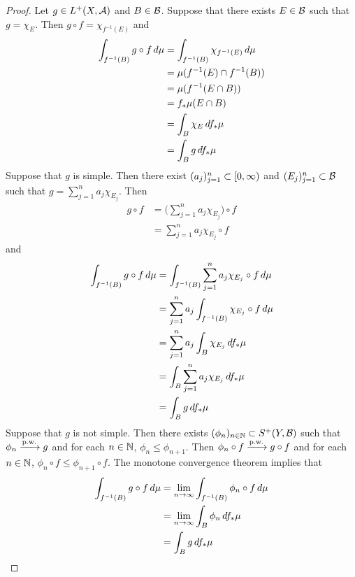 \documentclass{book}
\begin{document}
	\begin{proof}
		Let $g \in  L^+(X, \mathcal{A})$ and $B \in \mathcal{B}$. Suppose that there exists $E \in \mathcal{B}$ such that $g = \chi_E$. Then $g \circ f = \chi_{f^{-1}(E)}$ and
		\begin{align*}
			\int_{f^{-1}(B)} g \circ f \, d \mu
			& = \int_{f^{-1}(B)} \chi_{f^{-1}(E)} \, d \mu \\
			& = \mu(f^{-1}(E) \cap f^{-1}(B)) \\
			& = \mu( f^{-1}(E \cap B)) \\
			& = f_*\mu (E \cap B) \\
			& = \int_{B} \chi_{E} \, df_*\mu \\
			& = \int_{B} g \, df_*\mu 
 		\end{align*}
 		Suppose that $g$ is simple. Then there exist $(a_j)_{j=1}^n \subset [0,\infty)$ and $(E_j)_{j=1}^n \subset \mathcal{B}$ such that $g = \sum\limits_{j=1}^n a_j \chi_{E_j}$. 
 		Then 
 		\begin{align*}
 			g \circ f 
 			& = \bigg( \sum\limits_{j=1}^n a_j \chi_{E_j} \bigg) \circ f\\
 			& = \sum\limits_{j=1}^n a_j \chi_{E_j} \circ f
 		\end{align*}
 		and 
 		\begin{align*}
 			\int_{f^{-1}(B)} g \circ f \, d \mu
 			& = \int_{f^{-1}(B)} \sum\limits_{j=1}^n a_j \chi_{E_j} \circ f \, d \mu \\
 			& = \sum_{j=1}^n a_j \int_{f^{-1}(B)} \chi_{E_j} \circ f \, d \mu \\
 			& = \sum_{j=1}^n a_j \int_{B} \chi_{E_j} \, d f_*\mu \\
 			& = \int_{B} \sum_{j=1}^n a_j  \chi_{E_j} \, d f_*\mu \\
 			& = \int_{B} g \, d f_*\mu \\
 		\end{align*}
 		Suppose that $g$ is not simple. Then there exists $(\phi_n)_{n \in \mathbb{N}} \subset S^+(Y, \mathcal{B})$ such that $\phi_n \xrightarrow{\text{p.w.}} g$ and for each $n \in \mathbb{N}$, $\phi_n \leq \phi_{n+1}$. Then $\phi_n \circ f \xrightarrow{\text{p.w.}} g \circ f$ and for each $n \in \mathbb{N}$, $\phi_n \circ f \leq \phi_{n+1} \circ f$. The monotone convergence theorem implies that 
 		\begin{align*}
 			\int_{f^{-1}(B)} g \circ f \, d \mu
 			& = \lim \limits_{n \rightarrow \infty} \int_{f^{-1}(B)} \phi_n \circ f \, d \mu \\
 			& = \lim \limits_{n \rightarrow \infty} \int_{B} \phi_n \, d f_*\mu \\
 			& = \int_{B} g \, d f_*\mu \\
 		\end{align*}
	\end{proof}
\end{document}
